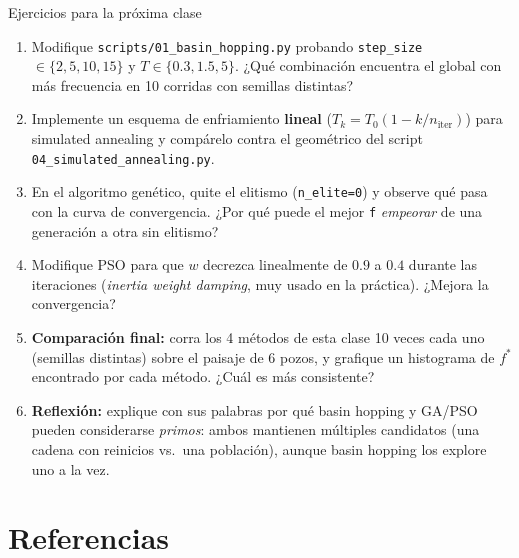 \documentclass[aspectratio=169,10pt]{beamer}
\begin{document}
\begin{frame}{Ejercicios para la próxima clase}
  \footnotesize
  \begin{enumerate}
    \item Modifique \texttt{scripts/01\_basin\_hopping.py} probando
      \texttt{step\_size} $\in\{2,5,10,15\}$ y $T\in\{0.3,1.5,5\}$.
      ¿Qué combinación encuentra el global con más frecuencia en 10
      corridas con semillas distintas?
    \item Implemente un esquema de enfriamiento \textbf{lineal}
      ($T_k=T_0(1-k/n_{\text{iter}})$) para simulated annealing y
      compárelo contra el geométrico del script
      \texttt{04\_simulated\_annealing.py}.
    \item En el algoritmo genético, quite el elitismo
      (\texttt{n\_elite=0}) y observe qué pasa con la curva de
      convergencia. ¿Por qué puede el mejor \texttt{f} \emph{empeorar}
      de una generación a otra sin elitismo?
    \item Modifique PSO para que $w$ decrezca linealmente de $0.9$ a
      $0.4$ durante las iteraciones (\emph{inertia weight damping}, muy
      usado en la práctica). ¿Mejora la convergencia?
    \item \textbf{Comparación final:} corra los 4 métodos de esta clase
      10 veces cada uno (semillas distintas) sobre el paisaje de 6
      pozos, y grafique un histograma de $f^*$ encontrado por cada
      método. ¿Cuál es más consistente?
    \item \textbf{Reflexión:} explique con sus palabras por qué basin
      hopping y GA/PSO pueden considerarse \emph{primos}: ambos mantienen
      múltiples candidatos (una cadena con reinicios vs.\ una
      población), aunque basin hopping los explore uno a la vez.
  \end{enumerate}
\end{frame}

\section{Referencias}
\end{document}
